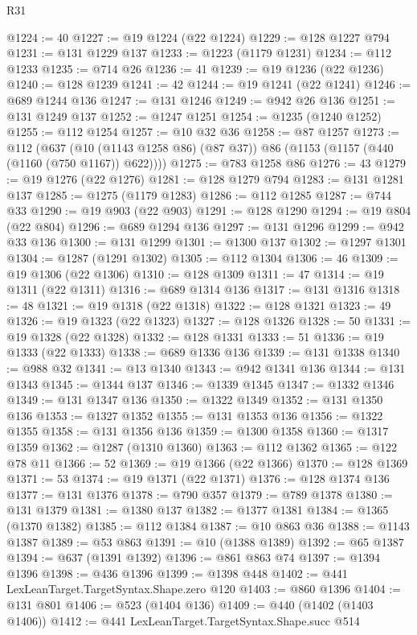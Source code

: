 \begin{lexlean}{R31}
\begin{coremodule}
@1224 := 40
@1227 := @19 @1224 (@22 @1224)
@1229 := @128 @1227 @794
@1231 := @131 @1229 @137
@1233 := @1223 (@1179 @1231)
@1234 := @112 @1233
@1235 := @714 @26
@1236 := 41
@1239 := @19 @1236 (@22 @1236)
@1240 := @128 @1239
@1241 := 42
@1244 := @19 @1241 (@22 @1241)
@1246 := @689 @1244 @136
@1247 := @131 @1246
@1249 := @942 @26 @136
@1251 := @131 @1249 @137
@1252 := @1247 @1251
@1254 := @1235 (@1240 @1252)
@1255 := @112 @1254
@1257 := @10 @32 @36
@1258 := @87 @1257
@1273 := @112
    (@637 (@10 (@1143 @1258 @86) (@87 @37)) @86 (@1153 (@1157 (@440 (@1160 (@750 @1167)) @622))))
@1275 := @783 @1258 @86
@1276 := 43
@1279 := @19 @1276 (@22 @1276)
@1281 := @128 @1279 @794
@1283 := @131 @1281 @137
@1285 := @1275 (@1179 @1283)
@1286 := @112 @1285
@1287 := @744 @33
@1290 := @19 @903 (@22 @903)
@1291 := @128 @1290
@1294 := @19 @804 (@22 @804)
@1296 := @689 @1294 @136
@1297 := @131 @1296
@1299 := @942 @33 @136
@1300 := @131 @1299
@1301 := @1300 @137
@1302 := @1297 @1301
@1304 := @1287 (@1291 @1302)
@1305 := @112 @1304
@1306 := 46
@1309 := @19 @1306 (@22 @1306)
@1310 := @128 @1309
@1311 := 47
@1314 := @19 @1311 (@22 @1311)
@1316 := @689 @1314 @136
@1317 := @131 @1316
@1318 := 48
@1321 := @19 @1318 (@22 @1318)
@1322 := @128 @1321
@1323 := 49
@1326 := @19 @1323 (@22 @1323)
@1327 := @128 @1326
@1328 := 50
@1331 := @19 @1328 (@22 @1328)
@1332 := @128 @1331
@1333 := 51
@1336 := @19 @1333 (@22 @1333)
@1338 := @689 @1336 @136
@1339 := @131 @1338
@1340 := @988 @32
@1341 := @13 @1340
@1343 := @942 @1341 @136
@1344 := @131 @1343
@1345 := @1344 @137
@1346 := @1339 @1345
@1347 := @1332 @1346
@1349 := @131 @1347 @136
@1350 := @1322 @1349
@1352 := @131 @1350 @136
@1353 := @1327 @1352
@1355 := @131 @1353 @136
@1356 := @1322 @1355
@1358 := @131 @1356 @136
@1359 := @1300 @1358
@1360 := @1317 @1359
@1362 := @1287 (@1310 @1360)
@1363 := @112 @1362
@1365 := @122 @78 @11
@1366 := 52
@1369 := @19 @1366 (@22 @1366)
@1370 := @128 @1369
@1371 := 53
@1374 := @19 @1371 (@22 @1371)
@1376 := @128 @1374 @136
@1377 := @131 @1376
@1378 := @790 @357
@1379 := @789 @1378
@1380 := @131 @1379
@1381 := @1380 @137
@1382 := @1377 @1381
@1384 := @1365 (@1370 @1382)
@1385 := @112 @1384
@1387 := @10 @863 @36
@1388 := @1143 @1387
@1389 := @53 @863
@1391 := @10 (@1388 @1389)
@1392 := @65 @1387
@1394 := @637 (@1391 @1392)
@1396 := @861 @863 @74
@1397 := @1394 @1396
@1398 := @436 @1396
@1399 := @1398 @448
@1402 := @441 LexLeanTarget.TargetSyntax.Shape.zero @120
@1403 := @860 @1396
@1404 := @131 @801
@1406 := @523 (@1404 @136)
@1409 := @440 (@1402 (@1403 @1406))
@1412 := @441 LexLeanTarget.TargetSyntax.Shape.succ @514

\end{coremodule}
\end{lexlean}
